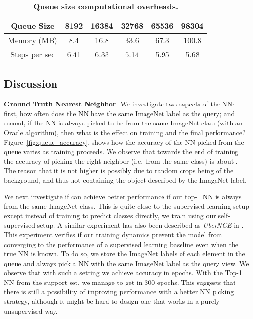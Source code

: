 \begin{table}[]
\small
    \centering
    \begin{tabular}{c|ccccc}
         Queue Size & 8192 & 16384 & 32768 & 65536 & 98304\\
         \midrule
         Memory (MB) &  8.4 & 16.8 & 33.6 & 67.3& 100.8\\
         Steps per sec & 6.41 & 6.33 & 6.14 & 5.95 & 5.68  \\
 
    \end{tabular}
    \caption{\textbf{Queue size computational overheads.}}
    \label{tab:compute}
\end{table}

\subsection{Discussion}

\noindent \textbf{Ground Truth Nearest Neighbor.} We investigate two aspects of the NN: first, how often does the NN have the same ImageNet label as the query; and second, if the NN is always picked to be from the same ImageNet class (with an Oracle algorithm), then what is the effect on training and the final performance? Figure~\ref{fig:queue_accuracy}, shows how the accuracy of the NN picked from the queue varies as training proceeds. We observe that towards the end of training the accuracy of picking the right neighbor (i.e.\ from the same class) is about . The reason that it is not higher is possibly due to random crops being of the background, and thus not containing the object described by the ImageNet label. 

We next investigate if \methodname can achieve better performance if our top-1 NN is always from the same ImageNet class. This is quite close to the supervised learning setup except instead of training to predict classes directly, we train using our self-supervised setup. A similar experiment has also been described as \textit{UberNCE} in \cite{Han20}. This experiment verifies if our training dynamics prevent the model from converging to the performance of a supervised learning baseline even when the true NN is known. To do so, we store the ImageNet labels of each element in the queue and always pick a NN with the same ImageNet label as the query view. We observe that with such a setting we achieve  accuracy in  epochs. With the Top-1 NN from the support set, we manage to get  in 300 epochs. This suggests that there is still a possibility of improving performance with a better NN picking strategy, although it might be hard to design one that works in a purely unsupervised way.


